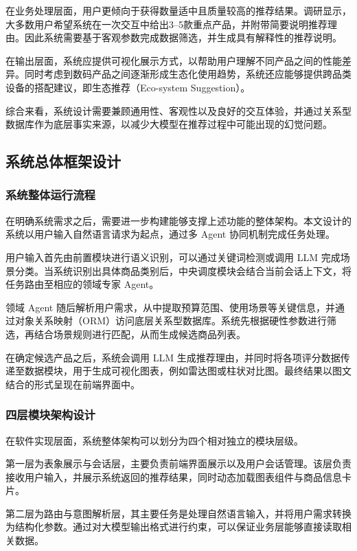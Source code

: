 \documentclass{nkuthesis}
\begin{document}
在业务处理层面，用户更倾向于获得数量适中且质量较高的推荐结果。调研显示，大多数用户希望系统在一次交互中给出3--5款重点产品，并附带简要说明推荐理由。因此系统需要基于客观参数完成数据筛选，并生成具有解释性的推荐说明。

在输出层面，系统应提供可视化展示方式，以帮助用户理解不同产品之间的性能差异。同时考虑到数码产品之间逐渐形成生态化使用趋势，系统还应能够提供跨品类设备的搭配建议，即生态推荐（Eco-system Suggestion）。

综合来看，系统设计需要兼顾通用性、客观性以及良好的交互体验，并通过关系型数据库作为底层事实来源，以减少大模型在推荐过程中可能出现的幻觉问题。

\subsection{系统总体框架设计}

\subsubsection{系统整体运行流程}

在明确系统需求之后，需要进一步构建能够支撑上述功能的整体架构。本文设计的系统以用户输入自然语言请求为起点，通过多 Agent 协同机制完成任务处理。

用户输入首先由前置模块进行语义识别，可以通过关键词检测或调用 LLM 完成场景分类。当系统识别出具体商品类别后，中央调度模块会结合当前会话上下文，将任务路由至相应的领域专家 Agent。

领域 Agent 随后解析用户需求，从中提取预算范围、使用场景等关键信息，并通过对象关系映射（ORM）访问底层关系型数据库。系统先根据硬性参数进行筛选，再结合场景规则进行匹配，从而生成候选商品列表。

在确定候选产品之后，系统会调用 LLM 生成推荐理由，并同时将各项评分数据传递至数据模块，用于生成可视化图表，例如雷达图或柱状对比图。最终结果以图文结合的形式呈现在前端界面中。

\subsubsection{四层模块架构设计}

在软件实现层面，系统整体架构可以划分为四个相对独立的模块层级。

第一层为表象展示与会话层，主要负责前端界面展示以及用户会话管理。该层负责接收用户输入，并展示系统返回的推荐结果，同时动态加载图表组件与商品信息卡片。

第二层为路由与意图解析层，其主要任务是处理自然语言输入，并将用户需求转换为结构化参数。通过对大模型输出格式进行约束，可以保证业务层能够直接读取相关数据。
\end{document}
